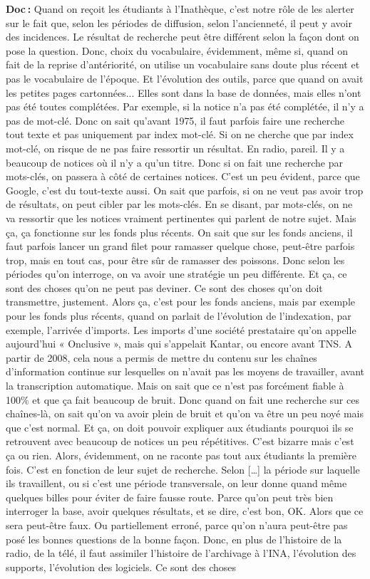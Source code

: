 \textbf{Doc :} Quand on reçoit les étudiants à l’Inathèque, c'est notre rôle de les alerter sur le fait que, selon les périodes de diffusion, selon l'ancienneté, il peut y avoir des incidences. Le résultat de recherche peut être différent selon la façon dont on pose la question. Donc, choix du vocabulaire, évidemment, même si, quand on fait de la reprise d’antériorité, on utilise un vocabulaire sans doute plus récent et pas le vocabulaire de l'époque.  Et l'évolution des outils, parce que quand on avait les petites pages cartonnées...  Elles sont dans la base de données, mais elles n'ont pas été toutes complétées. Par exemple, si la notice n'a pas été complétée, il n'y a pas de mot-clé. Donc on sait qu'avant 1975, il faut parfois faire une recherche tout texte et pas uniquement par index mot-clé. Si on ne cherche que par index mot-clé, on risque de ne pas faire ressortir un résultat. En radio, pareil. Il y a beaucoup de notices où il n'y a qu'un titre.  Donc si on fait une recherche par mots-clés, on passera à côté de certaines notices. C'est un peu évident, parce que Google, c'est du tout-texte aussi. On sait que parfois, si on ne veut pas avoir trop de résultats, on peut cibler par les mots-clés. En se disant, par mots-clés, on ne va ressortir que les notices vraiment pertinentes qui parlent de notre sujet. Mais ça, ça fonctionne sur les fonds plus récents. On sait que sur les fonds anciens, il faut parfois lancer un grand filet pour ramasser quelque chose, peut-être parfois trop, mais en tout cas, pour être sûr de ramasser des poissons. Donc selon les périodes qu'on interroge, on va avoir une stratégie un peu différente.  Et ça, ce sont des choses qu'on ne peut pas deviner. Ce sont des choses qu'on doit transmettre, justement.  Alors ça, c'est pour les fonds anciens, mais par exemple pour les fonds plus récents, quand on parlait de l'évolution de l'indexation, par exemple, l'arrivée d'imports. Les imports d’une société prestataire qu'on appelle aujourd'hui « Onclusive », mais qui s'appelait Kantar, ou encore avant TNS. A partir de 2008, cela nous a permis de mettre du contenu sur les chaînes d'information continue sur lesquelles on n'avait pas les moyens de travailler, avant la transcription automatique. Mais on sait que ce n’est pas forcément fiable à 100\% et que ça fait beaucoup de bruit. Donc quand on fait une recherche sur ces chaînes-là, on sait qu'on va avoir plein de bruit et qu'on va être un peu noyé mais que c'est normal. Et ça, on doit pouvoir expliquer aux étudiants pourquoi ils se retrouvent avec beaucoup de notices un peu répétitives. C'est bizarre mais c’est ça ou rien. Alors, évidemment, on ne raconte pas tout aux étudiants la première fois. C'est en fonction de leur sujet de recherche.  Selon […] la période sur laquelle ils travaillent, ou si c'est une période transversale, on leur donne quand même quelques billes pour éviter de faire fausse route. Parce qu'on peut très bien interroger la base, avoir quelques résultats, et se dire, c'est bon, OK. Alors que ce sera peut-être faux. Ou partiellement erroné, parce qu'on n'aura peut-être pas posé les bonnes questions de la bonne façon. Donc, en plus de l'histoire de la radio, de la télé, il faut assimiler l'histoire de l'archivage à l'INA, l'évolution des supports, l'évolution des logiciels. Ce sont des choses 